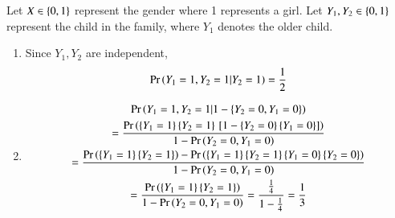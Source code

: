 Let $X \in \left\{0,1\right\}$ represent the gender where 1 represents a girl. Let $Y_1,Y_2 \in \left\{0,1\right\}$ represent the child in the family, where $Y_1$ denotes the older child.
\begin{enumerate}
\item Since $Y_1,Y_2$ are independent,
\begin{align}
\Pr\left(Y_1 = 1,Y_2=1|Y_2 = 1\right) = \frac{1}{2}
\end{align}
\item 
{\tiny
\begin{multline}
\Pr\left(Y_1 = 1,Y_2=1|1-\left\{Y_2 = 0,Y_1=0\right\}\right) 
\\
=\frac{\Pr\left(\left\{Y_1 = 1\right\}\left\{Y_2=1\right\}{}\left[1-\left\{Y_2 = 0\right\}\left\{Y_1=0\right\}\right]\right)}{1-\Pr\left(Y_2 = 0,Y_1=0\right)} 
\\
=\frac{\Pr\left(\left\{Y_1 = 1\right\}\left\{Y_2=1\right\}\right)-\Pr\left(\left\{Y_1 = 1\right\}\left\{Y_2=1\right\}\left\{Y_1 = 0\right\}\left\{Y_2=0\right\}\right) 
}{1-\Pr\left(Y_2 = 0,Y_1=0\right)} 
\\
=\frac{\Pr\left(\left\{Y_1 = 1\right\}\left\{Y_2=1\right\}\right)
}{1-\Pr\left(Y_2 = 0,Y_1=0\right)} 
=\frac{\frac{1}{4}}{1-\frac{1}{4}} = \frac{1}{3}
\end{multline}
}
\end{enumerate}
